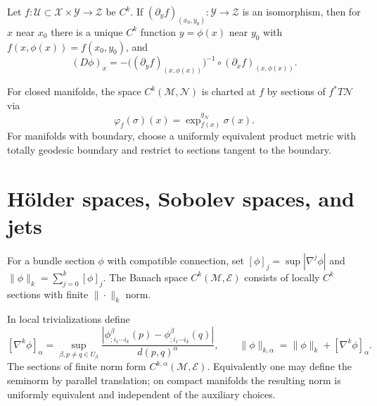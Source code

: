 \begin{theorem}
\label{thm:chow-iv-k4-banach-implicit-function}


Let $f:\mathcal U\subset\mathcal X\times\mathcal Y\to\mathcal Z$ be $C^k$.
If $(\partial_yf)_{(x_0,y_0)}:\mathcal Y\to\mathcal Z$ is an isomorphism,
then for $x$ near $x_0$ there is a unique $C^k$ function $y=\phi(x)$ near
$y_0$ with $f(x,\phi(x))=f(x_0,y_0)$, and
\[
(D\phi)_x=-\bigl((\partial_yf)_{(x,\phi(x))}\bigr)^{-1}
\circ(\partial_xf)_{(x,\phi(x))}.
\]
\end{theorem}

\begin{definition}
\label{def:chow-iv-k5-map-banach-manifold}

For closed manifolds, the space $C^k(\mathcal M,\mathcal N)$ is charted at
$f$ by sections of $f^*T\mathcal N$ via
\[
\varphi_f(\sigma)(x)=\exp^{g_{\mathcal N}}_{f(x)}\sigma(x).
\]
For manifolds with boundary, choose a uniformly equivalent product metric with
totally geodesic boundary and restrict to sections tangent to the boundary.
\end{definition}

\section{Hölder spaces, Sobolev spaces, and jets}

\begin{definition}
\label{def:chow-iv-k6-ck-sections}

For a bundle section $\phi$ with compatible connection, set
$[\phi]_j=\sup|\nabla^j\phi|$ and
$\|\phi\|_k=\sum_{j=0}^k[\phi]_j$.  The Banach space
$C^k(\mathcal M,\mathcal E)$ consists of locally $C^k$ sections with finite
$\|\cdot\|_k$ norm.
\end{definition}

\begin{definition}
\label{def:chow-iv-k7-holder-spaces}


In local trivializations define
\[
[\nabla^k\phi]_\alpha=
\sup_{\beta,p\ne q\in U_\beta}
\frac{|\phi^\beta_{;i_1\cdots i_k}(p)-\phi^\beta_{;i_1\cdots i_k}(q)|}{d(p,q)^\alpha},
\qquad
\|\phi\|_{k,\alpha}=\|\phi\|_k+[\nabla^k\phi]_\alpha.
\]
The sections of finite norm form $C^{k,\alpha}(\mathcal M,\mathcal E)$.
Equivalently one may define the seminorm by parallel translation; on compact
manifolds the resulting norm is uniformly equivalent and independent of the
auxiliary choices.
\end{definition}

